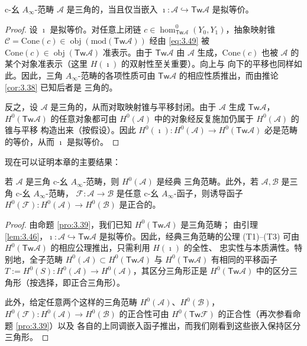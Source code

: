 \begin{Lem}\label{lem:3.46}
c-幺 $A_\infty$-范畴 $\mathcal A$ 是三角的，当且仅当嵌入
$\imath:\mathcal A\hookrightarrow\mathsf{Tw}\mathcal A$ 是拟等价。
\end{Lem}

\begin{proof}
设 $\imath$ 是拟等价。对任意上闭链
$c\in\hom^0_{\mathsf{Tw}\mathcal A}(Y_0,Y_1)$，抽象映射锥
$\mathcal C=\mathrm{Cone}(c)\in\operatorname{obj}
(\mathrm{mod}(\mathsf{Tw}\mathcal A))$ 经由 \eqref{eq:3.49} 被
$\mathrm{Cone}(c)\in\operatorname{obj}(\mathsf{Tw}\mathcal A)$ 准表示。由于
$\mathsf{Tw}\mathcal A$ 由 $\mathcal A$ 生成，$\mathrm{Cone}(c)$ 也被
$\mathcal A$ 的某个对象准表示（这里 $H(\imath)$ 的双射性至关重要）。向上与
向下的平移也同样如此。因此，三角 $A_\infty$-范畴的各项性质可由
$\mathsf{Tw}\mathcal A$ 的相应性质推出，而由推论 \ref{cor:3.38} 已知后者是
三角的。

反之，设 $\mathcal A$ 是三角的，从而对取映射锥与平移封闭。由于 $\mathcal A$
生成 $\mathsf{Tw}\mathcal A$，$H^0(\mathsf{Tw}\mathcal A)$ 的任意对象都可由
$H^0(\mathcal A)$ 中的对象经反复施加仍属于 $H^0(\mathcal A)$ 的锥与平移
构造出来（按假设）。因此 $H^0(\imath):H^0(\mathcal A)\to
H^0(\mathsf{Tw}\mathcal A)$ 必是范畴的等价，从而 $\imath$ 是拟等价。
\end{proof}

现在可以证明本章的主要结果：

\begin{Pro}\label{pro:3.47}
若 $\mathcal A$ 是三角 c-幺 $A_\infty$-范畴，则 $H^0(\mathcal A)$ 是经典
三角范畴。此外，若 $\mathcal A,\mathcal B$ 是三角 c-幺 $A_\infty$-范畴，
$\mathcal F:\mathcal A\to\mathcal B$ 是任意 c-幺 $A_\infty$-函子，则诱导函子
$H^0(\mathcal F):H^0(\mathcal A)\to H^0(\mathcal B)$ 是正合的。
\end{Pro}

\begin{proof}
由命题 \ref{pro:3.39}，我们已知 $H^0(\mathsf{Tw}\mathcal A)$ 是三角范畴；
由引理 \ref{lem:3.46}，$\imath:\mathcal A\hookrightarrow\mathsf{Tw}\mathcal A$
是拟等价。因此，经典三角范畴的公理 (T1)–(T3) 可由
$H^0(\mathsf{Tw}\mathcal A)$ 的相应公理推出，只需利用 $H(\imath)$ 的全性、
忠实性与本质满性。特别地，全子范畴 $H^0(\mathcal A)\subset
H^0(\mathsf{Tw}\mathcal A)$ 与 $H^0(\mathsf{Tw}\mathcal A)$ 有相同的平移函子
$T:=H^0(S):H^0(\mathcal A)\to H^0(\mathcal A)$，其区分三角形正是
$H^0(\mathsf{Tw}\mathcal A)$ 中的区分三角形（按选择，即正合三角形）。

此外，给定任意两个这样的三角范畴 $H^0(\mathcal A)$、$H^0(\mathcal B)$，
$H^0(\mathcal F):H^0(\mathcal A)\to H^0(\mathcal B)$ 的正合性可由
$H^0(\mathsf{Tw}\mathcal F)$ 的正合性（再次参看命题 \ref{pro:3.39}）以及
各自的上同调嵌入函子推出，而我们刚看到这些嵌入保持区分三角形。
\end{proof}

